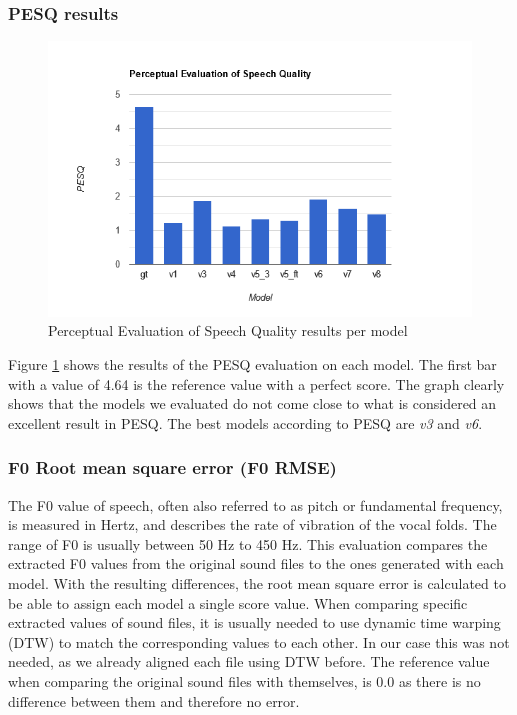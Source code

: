 \documentclass[a4paper]{article}
\begin{document}
	\subsubsection{PESQ results}
	\begin{figure}[hbtp]
		\includegraphics[width=\textwidth]{evaluation/graphs/PESQ.png}
		\caption{Perceptual Evaluation of Speech Quality results per model}
		\label{fig:pesq_results}
	\end{figure}
	
	Figure \ref{fig:pesq_results} shows the results of the PESQ evaluation on each
	model. The first bar with a value of 4.64 is the reference value with a perfect
	score. The graph clearly shows that the models we evaluated do not come close to
	what is considered an excellent result in PESQ. The best models according to
	PESQ are \emph{v3} and \emph{v6}.
	
	\subsubsection{F0 Root mean square error (F0 RMSE)}
	The F0 value of speech, often also referred to as pitch or fundamental
	frequency, is measured in Hertz, and describes the rate of vibration of the
	vocal folds. The range of F0 is usually between 50 Hz to 450 Hz. This evaluation
	compares the extracted F0 values from the original sound files to the ones
	generated with each model. With the resulting differences, the root mean square
	error is calculated to be able to assign each model a single score value. When
	comparing specific extracted values of sound files, it is usually needed to use
	dynamic time warping (DTW) to match the corresponding values to each other. In
	our case this was not needed, as we already aligned each file using DTW before.
	The reference value when comparing the original sound files with themselves, is
	0.0 as there is no difference between them and therefore no error.
	
\end{document}
